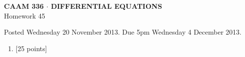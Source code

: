 \documentclass[10pt]{article}
\begin{document}
\vspace*{-5em}
\begin{center}
\large \textsf{\textbf{CAAM 336 $\cdot$ DIFFERENTIAL EQUATIONS}\\[0.5em]
Homework 45 }
\end{center}

Posted Wednesday 20 November 2013.  Due 5pm Wednesday 4 December 2013.

\begin{enumerate}\addtocounter{enumi}{44}
\item {[25 points]}  
\end{enumerate}
\end{document}
